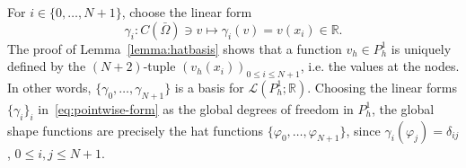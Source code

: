For $i \in \{0, \dots, N+1\}$, choose the linear form
\begin{equation}\label{eq:pointwise-form}
    \gamma_i: C(\bar{\Omega}) \ni v \mapsto \gamma_i(v) = v(x_i) \in \mathbb{R}.
\end{equation}
The proof of Lemma~\ref{lemma:hatbasis} shows that a function $v_h \in P_h^1$ is uniquely defined by the $(N+2)$-tuple $(v_h(x_i))_{0 \le i \le N+1}$, i.e. the values at the nodes. In other words, $\{\gamma_0, \dots, \gamma_{N+1}\}$ is a basis for $\mathcal{L}(P_h^1; \mathbb{R})$. Choosing the linear forms $\{\gamma_i\}_i$ in~\ref{eq:pointwise-form} as the global degrees of freedom in $P_h^1$, the global shape functions are precisely the hat functions $\{\varphi_0, \dots, \varphi_{N+1}\}$, since $\gamma_i(\varphi_j) = \delta_{ij}$, $0 \le i,j \le N+1$.

